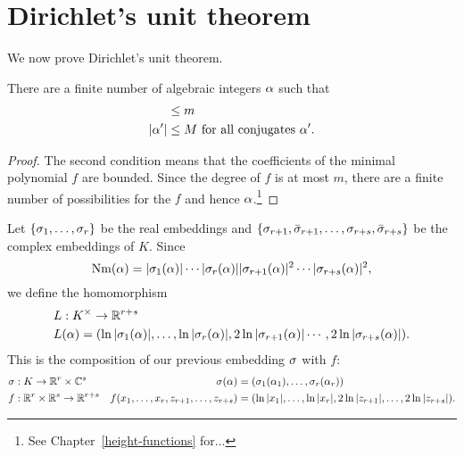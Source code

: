 \section{Dirichlet's unit theorem}
We now prove Dirichlet's unit theorem.
\begin{lem}
There are a finite number of algebraic integers $\alpha$ such that
\begin{align*}
[\Q(\al):\Q]&\le m\\
|\al'|&\le M \text{ for all conjugates }\al'.
\end{align*}
\end{lem}
\begin{proof}
The second condition means that the coefficients of the minimal polynomial $f$ are bounded. Since the degree of $f$ is at most $m$, there are a finite number of possibilities for the $f$ and hence $\alpha$.\footnote{See Chapter~\ref{height-functions} for...}
\end{proof}

Let $\{\sigma_1,\ldots, \sigma_r\}$ be the real embeddings and $\{\sigma_{r+1},\bar{\sigma}_{r+1},\ldots, \sigma_{r+s},\bar{\sigma}_{r+s}\}$ be the complex embeddings of $K$. Since
\[
\operatorname{Nm}(\alpha)=|\sigma_1(\alpha)|\cdots |\sigma_r(\alpha)||\sigma_{r+1}(\alpha)|^2\cdots |\sigma_{r+s}(\alpha)|^2,
\]
we define the homomorphism
\begin{align*}
&L:K^{\times}\to \mathbb{R}^{r+s}\\
&L(\alpha)=(\ln |\sigma_1(\alpha)|,\ldots, \ln|\sigma_r(\alpha)|,2\ln |\sigma_{r+1}(\alpha)|\cdots ,2\ln |\sigma_{r+s}(\alpha)|).
\end{align*}
This is the composition of our previous embedding $\sigma$ with $f$:
\begin{align*}
&\sigma:K \to \mathbb{R}^r\times \mathbb{C}^s&\sigma(\alpha)&=(\sigma_1(\alpha_1), \ldots, \sigma_r(\alpha_r))\\
&f:\mathbb{R}^r\times \mathbb{R}^s\to \mathbb{R}^{r+s}&f(x_1,\ldots, x_r,z_{r+1},\ldots, z_{r+s})&=(\ln |x_1|,\ldots, \ln|x_r|,2\ln|z_{r+1}|,\ldots, 2\ln|z_{r+s}|).
\end{align*}

